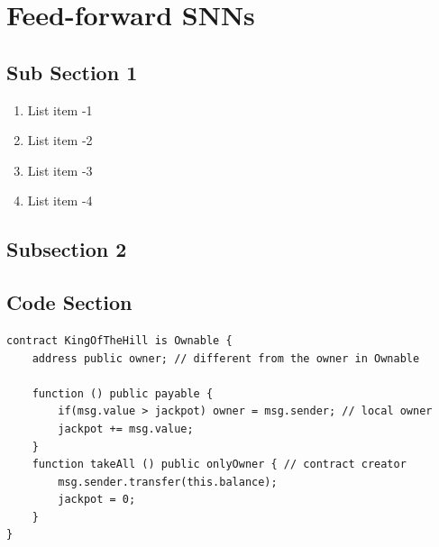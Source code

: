 \section{Feed-forward SNNs} \label{sec:sed-ultrices}

\subsection{Sub Section 1}


\begin{enumerate}
\item{List item -1}
\item{List item -2}
\item{List item -3}
\item{List item -4}
\end{enumerate}

\subsection{Subsection 2}

\begin{outline}
\lipsum[3]
\end{outline}

\subsection{Code Section}

\begin{lstlisting}[language=Solidity]
contract KingOfTheHill is Ownable {
    address public owner; // different from the owner in Ownable

    function () public payable {
        if(msg.value > jackpot) owner = msg.sender; // local owner
        jackpot += msg.value;
    }
    function takeAll () public onlyOwner { // contract creator
        msg.sender.transfer(this.balance);
        jackpot = 0;
    }
}
\end{lstlisting}
